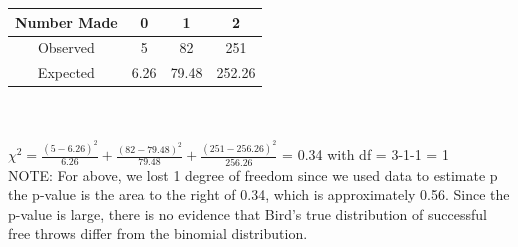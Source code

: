 \documentclass[12pt, a4paper]{article}
\begin{document}
	\begin{tabular}{ |c|c|c|c| }
		\hline
		Number Made & 0 & 1 & 2 \\ \hline
		Observed & 5 & 82 & 251 \\
		Expected & 6.26 & 79.48 & 252.26 \\
		\hline
	\end{tabular} \\~\\
	$\chi^2 = \frac{(5-6.26)^2}{6.26} + \frac{(82-79.48)^2}{79.48} + \frac{(251-256.26)^2}{256.26}$ = 0.34 with df = 3-1-1 = 1 \\ NOTE: For above, we lost 1 degree of freedom since we used data to estimate p \\ the p-value is the area to the right of 0.34, which is approximately 0.56. Since the p-value is large, there is no evidence that Bird's true distribution of successful free throws differ from the binomial distribution. \\~\\
	
\end{document}
